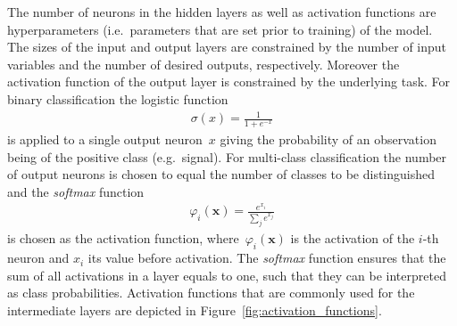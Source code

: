 The number of neurons in the hidden layers as well as activation functions are
hyperparameters (i.e.\ parameters that are set prior to training) of the model.
The sizes of the input and output layers are constrained by the number of input
variables and the number of desired outputs, respectively. Moreover the
activation function of the output layer is constrained by the underlying task.
For binary classification the logistic function
\begin{align*}
  \sigma(x) = \frac{1}{1 + e^{-x}}
\end{align*}
is applied to a single output neuron~$x$ giving the probability of an
observation being of the positive class (e.g.\ signal). For multi-class
classification the number of output neurons is chosen to equal the number of
classes to be distinguished and the \emph{softmax} function \cite{esl, bishop}
\begin{align*}
  \varphi_i(\mathbf{x}) = \frac{e^{x_i}}{\sum_j e^{x_j}}
\end{align*}
is chosen as the activation function, where~$\varphi_i(\mathbf{x})$ is the
activation of the $i$-th neuron and $x_i$ its value before activation. The
\emph{softmax} function ensures that the sum of all activations in a layer
equals to one, such that they can be interpreted as class probabilities.
Activation functions that are commonly used for the intermediate layers are
depicted in Figure~\ref{fig:activation_functions}.

